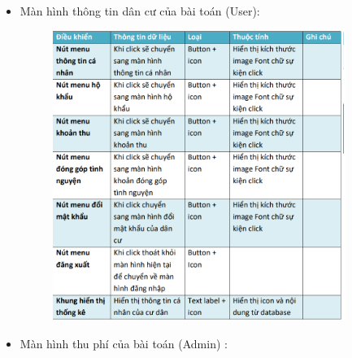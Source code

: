 \documentclass{article}
\begin{document}
\begin{itemize}
\begin{figure}[H]
    \end{figure}
    \item Màn hình thông tin dân cư của bài toán (User):
    \begin{figure}[H]
        \centering
        \includegraphics[width=0.9\textwidth]{Ảnh chương 4/Thông tin dân cư User 1.png}
    \end{figure}
    \vspace{1cm}
    \item Màn hình thu phí của bài toán (Admin) :
    \begin{figure}[H]
        \centering

\end{figure}
\end{itemize}
\end{document}
